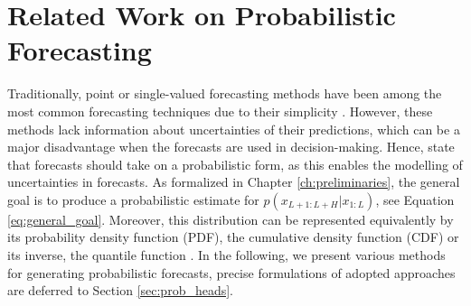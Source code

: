 \documentclass[a4paper,oneside,bibliography=totoc]{scrbook}
\begin{document}
\clearpage
\section{Related Work on Probabilistic Forecasting}
\label{sec:related_work_PF}
Traditionally, point or single-valued forecasting methods have been among the most common forecasting techniques due to their simplicity \cite{benidis_deep_2022}. However, these methods lack information about uncertainties of their predictions, which can be a major disadvantage when the forecasts are used in decision-making. Hence, \citet{gneiting_probabilistic_2014} state that forecasts should take on a probabilistic form, as this enables the modelling of uncertainties in forecasts. 
As formalized in Chapter \ref{ch:preliminaries}, the general goal is to produce a probabilistic estimate for $p(x_{L+1:L+H}| x_{1:L})$, see Equation \ref{eq:general_goal}.
Moreover, this distribution can be represented equivalently by its probability density function (PDF), the cumulative density function (CDF) or its inverse, the quantile function \cite{benidis_deep_2022}.
In the following, we present various methods for generating probabilistic forecasts, precise formulations of adopted approaches are deferred to Section \ref{sec:prob_heads}.
\end{document}

